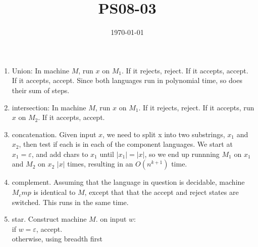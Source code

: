 \documentclass{article}
\title{PS08-03}
\date{\today}
\begin{document}
\maketitle
\begin{enumerate}[label=\alph*.]
	\item Union: In machine $M$, run $x$ on $M_1$. If it rejects, reject. If it accepts, accept. If it accepts, accept. Since both languages run in polynomial time, so does their sum of steps.
	\item intersection: In machine $M$, run $x$ on $M_1$. If it rejects, reject. If it accepts, run $x$ on $M_2$. If it accepts, accept. 
	\item concatenation.
	Given input $x$, we need to split x into two substrings, $x_1$ and $x_2$, then test if each is in each of the component languages. We start at $x_1 = \varepsilon$, and add chars to $x_1$ until $\lvert x_1 \rvert = \lvert x \rvert$, so we end up runnning $M_1$ on $x_1$ and $M_2$ on $x_2$ $\lvert x \rvert$ times, resulting in an $O(n^{k+1})$ time.
	\item complement.
	Assuming that the language in question is decidable, machine $M_cmp$ is identical to $M$, except that that the accept and reject states are switched. This runs in the same time. 
	\item star. Construct machine $M$.
	on input $w$:\\
	if $w = \varepsilon$, accept.\\
	otherwise, using breadth first
\end{enumerate}
\end{document}
